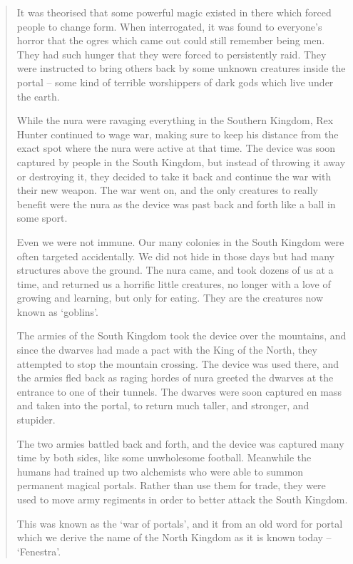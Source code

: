 \begin{multicols}{2}
\begin{quotation}
	It was theorised that some powerful magic existed in there which forced people to change form.
	When interrogated, it was found to everyone's horror that the ogres which came out could still remember being men.
	They had such hunger that they were forced to persistently raid.
	They were instructed to bring others back by some unknown creatures inside the portal -- some kind of terrible worshippers of dark gods which live under the earth.

	While the nura were ravaging everything in the Southern Kingdom, Rex Hunter continued to wage war, making sure to keep his distance from the exact spot where the nura were active at that time.
	The device was soon captured by people in the South Kingdom, but instead of throwing it away or destroying it, they decided to take it back and continue the war with their new weapon.
	The war went on, and the only creatures to really benefit were the nura as the device was past back and forth like a ball in some sport.

	Even we were not immune.
	Our many colonies in the South Kingdom were often targeted accidentally.
	We did not hide in those days but had many structures above the ground.
	The nura came, and took dozens of us at a time, and returned us a horrific little creatures, no longer with a love of growing and learning, but only for eating.
	They are the creatures now known as `goblins'.

	The armies of the South Kingdom took the device over the mountains, and since the dwarves had made a pact with the King of the North, they attempted to stop the mountain crossing.
	The device was used there, and the armies fled back as raging hordes of nura greeted the dwarves at the entrance to one of their tunnels.
	The dwarves were soon captured en mass and taken into the portal, to return much taller, and stronger, and stupider.

	The two armies battled back and forth, and the device was captured many time by both sides, like some unwholesome football.
	Meanwhile the humans had trained up two alchemists who were able to summon permanent magical portals.
	Rather than use them for trade, they were used to move army regiments in order to better attack the South Kingdom.

	This was known as the `war of portals', and it from an old word for portal which we derive the name of the North Kingdom as it is known today -- `Fenestra'.

\end{quotation}


\end{multicols}
